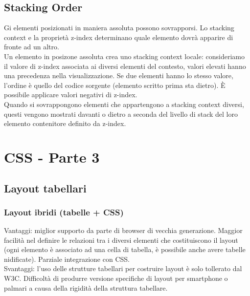 \documentclass{article}
\begin{document}
\subsection{Stacking Order}
Gi elementi posizionati in maniera assoluta possono sovrapporsi. Lo stacking context e la proprietà z-index determinano quale elemento dovrà apparire di fronte ad un altro.\\
Un elemento in posizone assoluta crea uno stacking context locale: consideriamo il valore di z-index associata ai diversi elementi del contesto, valori elevati hanno una precedenza nella visualizzazione. Se due elementi hanno lo stesso valore, l'ordine è quello del codice sorgente (elemento scritto prima sta dietro). È possibile applicare valori negativi di z-index.\\
Quando si sovrappongono elementi che appartengono a stacking context diversi, questi vengono mostrati davanti o dietro a seconda del livello di stack del loro elemento contenitore definito da z-index.
\section{CSS - Parte 3}
\subsection{Layout tabellari}
\subsubsection{Layout ibridi (tabelle + CSS)}
Vantaggi: miglior supporto da parte di browser di vecchia generazione. Maggior facilità nel definire le relazioni tra i diversi elementi che costituiscono il layout (ogni elemento è associato ad una cella di tabella, è possibile anche avere tabelle nidificate). Parziale integrazione con CSS.\\
Svantaggi: l'uso delle strutture tabellari per costruire layout è solo tollerato dal W3C. Difficoltà di produrre versione specifiche di layout per smartphone o palmari a causa della rigidità della struttura tabellare.
\end{document}
